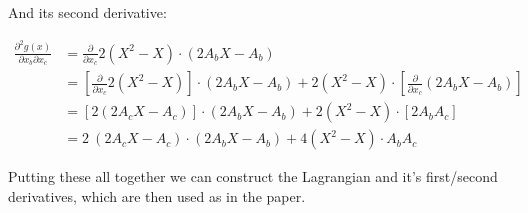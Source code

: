 \documentclass{article}
\begin{document}
And its second derivative:

\begin{align}
\frac{\partial^2 g(x)}{\partial x_b \partial x_c} &= \frac{\partial}{\partial x_c} 2 (X^2 - X) \cdot (2 A_b X - A_b) \\
												  &= \left[ \frac{\partial}{\partial x_c} 2 (X^2 - X) \right] \cdot (2 A_b X - A_b) +  2 (X^2 - X) \cdot \left[ \frac{\partial}{\partial x_c} (2 A_b X - A_b) \right] \\
												  &= \left[ 2 (2 A_c X - A_c) \right] \cdot (2 A_b X - A_b) +  2 (X^2 - X) \cdot \left[ 2 A_b A_c \right] \\
												  &= 2 ~ (2 A_c X - A_c) \cdot (2 A_b X - A_b) +  4 (X^2 - X) \cdot A_b A_c 
\end{align}

Putting these all together we can construct the Lagrangian and it's first/second derivatives, which are then used as in the paper.
\end{document}
